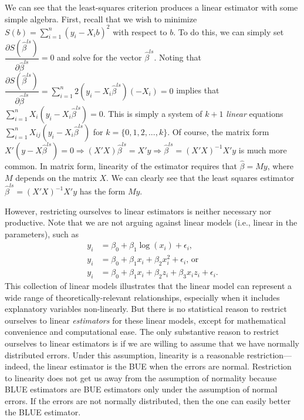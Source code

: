 \documentclass[12pt]{article}
\begin{document}
We can see that the least-squares criterion produces a linear estimator with some simple algebra. 
First, recall that we wish to minimize $S(b) = \sum_{i = 1}^n(y_i - X_ib)^2$ with respect to $b$. 
To do this, we can simply set $\dfrac{\partial S(\hat{\beta}^{ls})}{\partial \hat{\beta}^{ls}} = 0$ and solve for the vector $\hat{\beta}^{ls}$. 
Noting that $\dfrac{\partial S(\hat{\beta}^{ls})}{\partial \hat{\beta}^{ls}} = \sum_{i = 1}^n 2(y_i - X_i\hat{\beta}^{ls})(-X_i) = 0$ implies that $\sum_{i = 1}^n X_i(y_i - X_i\hat{\beta}^{ls}) = 0$. 
This is simply a system of $k+1$ \textit{linear} equations $\sum_{i = 1}^n X_{ij}(y_i - X_i\hat{\beta}^{ls})$ for $k = \{0, 1, 2,..., k\}$. 
Of course, the matrix form $X'(y - X\hat{\beta}^{ls}) = 0 \Rightarrow (X'X)\hat{\beta}^{ls} = X'y \Rightarrow \hat{\beta}^{ls} = (X'X)^{-1}X'y$ is much more common. 
In matrix form, linearity of the estimator requires that $\hat{\beta} = My$, where $M$ depends on the matrix $X$. 
We can clearly see that the least squares estimator $\hat{\beta}^{ls} = (X'X)^{-1}X'y$ has the form $My$.

However, restricting ourselves to linear estimators is neither necessary nor productive. 
Note that we are not arguing against linear models (i.e., linear in the parameters), such as 
\begin{align*}
y_i &= \beta_0 + \beta_1\log(x_i) + \epsilon_i\text{,}\\
y_i &= \beta_0 + \beta_1x_i + \beta_2x_i^2 + \epsilon_i\text{, or}\\ 
y_i &= \beta_0 + \beta_1x_i + \beta_2z_i + \beta_3x_iz_i + \epsilon_i\textit{.}
\end{align*}
This collection of linear models illustrates that the linear model can represent a wide range of theoretically-relevant relationships, especially when it includes explanatory variables non-linearly. 
But there is no statistical reason to restrict ourselves to linear \textit{estimators} for these linear models, except for mathematical convenience and computational ease.
The only substantive reason to restrict ourselves to linear estimators is if we are willing to assume that we have normally distributed errors. 
Under this assumption, linearity is a reasonable restriction---indeed, the linear estimator is the BUE when the errors are normal.
Restriction to linearity does not get us away from the assumption of normality because BLUE estimators are BUE estimators only under the assumption of normal errors.
If the errors are not normally distributed, then the one can easily better the BLUE estimator.
\end{document}

